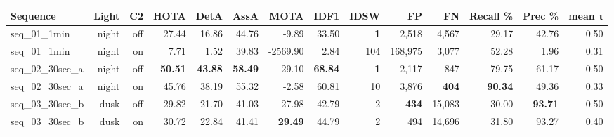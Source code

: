 \begin{tabular}{lrrrrrrrrrrrrr}
\toprule
Sequence & Light & C2 & HOTA & DetA & AssA & MOTA & IDF1 & IDSW & FP & FN & Recall \% & Prec \% & mean τ \\
\midrule
seq\_01\_1min & night & off & 27.44 & 16.86 & 44.76 & -9.89 & 33.50 & \textbf{1} & 2,518 & 4,567 & 29.17 & 42.76 & 0.50 \\
seq\_01\_1min & night & on & 7.71 & 1.52 & 39.83 & -2569.90 & 2.84 & 104 & 168,975 & 3,077 & 52.28 & 1.96 & 0.31 \\
seq\_02\_30sec\_a & night & off & \textbf{50.51} & \textbf{43.88} & \textbf{58.49} & 29.10 & \textbf{68.84} & \textbf{1} & 2,117 & 847 & 79.75 & 61.17 & 0.50 \\
seq\_02\_30sec\_a & night & on & 45.76 & 38.19 & 55.32 & -2.58 & 60.81 & 10 & 3,876 & \textbf{404} & \textbf{90.34} & 49.36 & 0.33 \\
seq\_03\_30sec\_b & dusk & off & 29.82 & 21.70 & 41.03 & 27.98 & 42.79 & 2 & \textbf{434} & 15,083 & 30.00 & \textbf{93.71} & 0.50 \\
seq\_03\_30sec\_b & dusk & on & 30.72 & 22.84 & 41.41 & \textbf{29.49} & 44.79 & 2 & 494 & 14,696 & 31.80 & 93.27 & 0.40 \\
\bottomrule
\end{tabular}
